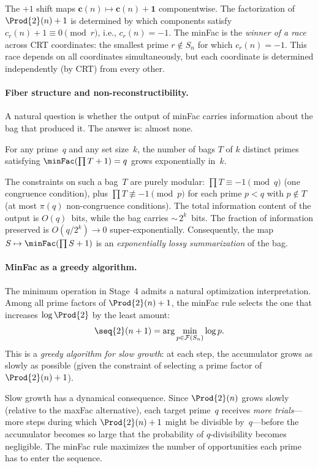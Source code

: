The $+1$ shift maps $\mathbf{c}(n) \mapsto \mathbf{c}(n) + \mathbf{1}$
componentwise.  The factorization of $\Prod{2}(n)+1$ is determined by which
components satisfy $c_r(n) + 1 \equiv 0 \pmod{r}$, i.e., $c_r(n) = -1$.
The minFac is the \emph{winner of a race} across CRT coordinates: the
smallest prime $r \notin S_n$ for which $c_r(n) = -1$.  This race
depends on all coordinates simultaneously, but each coordinate is
determined independently (by CRT) from every other.

\paragraph{Fiber structure and non-reconstructibility.}
A natural question is whether the output of minFac carries information
about the bag that produced it.  The answer is: almost none.

\begin{proposition}
For any prime~$q$ and any set size~$k$, the number of bags $T$ of $k$
distinct primes satisfying $\minFac(\prod T + 1) = q$ grows
exponentially in~$k$.
\end{proposition}

The constraints on such a bag~$T$ are purely modular:
$\prod T \equiv -1 \pmod{q}$ (one congruence condition), plus
$\prod T \not\equiv -1 \pmod{p}$ for each prime $p < q$ with
$p \notin T$ (at most $\pi(q)$ non-congruence conditions).  The total
information content of the output is $O(q)$~bits, while the bag carries
${\sim}\, 2^k$~bits.  The fraction of information preserved is
$O(q / 2^k) \to 0$ super-exponentially.  Consequently, the map
$S \mapsto \minFac(\prod S + 1)$ is an \emph{exponentially lossy
summarization} of the bag.

\paragraph{MinFac as a greedy algorithm.}
The minimum operation in Stage~4 admits a natural optimization
interpretation.  Among all prime factors of $\Prod{2}(n)+1$, the minFac
rule selects the one that increases $\log \Prod{2}$ by the least amount:
\[
\seq{2}(n+1) = \arg\min_{p \in \mathcal{F}(S_n)} \log p.
\]
This is a \emph{greedy algorithm for slow growth}: at each step, the
accumulator grows as slowly as possible (given the constraint of
selecting a prime factor of $\Prod{2}(n)+1$).

Slow growth has a dynamical consequence.  Since $\Prod{2}(n)$ grows slowly
(relative to the maxFac alternative), each target prime~$q$ receives
\emph{more trials}---more steps during which $\Prod{2}(n)+1$ might be
divisible by~$q$---before the accumulator becomes so large that the
probability of $q$-divisibility becomes negligible.  The minFac rule
maximizes the number of opportunities each prime has to enter the
sequence.

